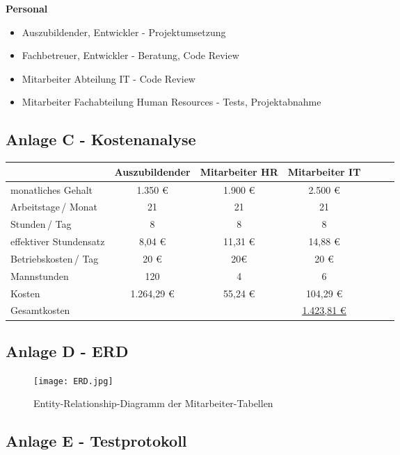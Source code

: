 {\textbf{Personal}}
    \begin{itemize}
        \item Auszubildender, Entwickler - Projektumsetzung
        \item Fachbetreuer, Entwickler - Beratung, Code Review
        \item Mitarbeiter Abteilung IT - Code Review
        \item Mitarbeiter Fachabteilung Human Resources - Tests, Projektabnahme
    \end{itemize}
\pagebreak

\subsection{Anlage C - Kostenanalyse}
\label{anlage:kosten}

\begin{table}[h]
    \centering
    \begin{tabular}{p{3cm} ccc p{3cm} p{3cm} p{3cm}}
        & Auszubildender & Mitarbeiter HR & Mitarbeiter IT\\
        \hline
        monatliches \mbox{Gehalt} & 1.350 € & 1.900 € & 2.500 € \\
        Arbeitstage\,/ \mbox{Monat} & 21 & 21 & 21\\
        Stunden\,/ Tag & 8 & 8 & 8\\
        effektiver \mbox{Stundensatz} & 8,04 € & 11,31 € & 14,88 €\\
        Betriebskosten\,/ Tag & 20 € & 20€ & 20 €\\
        Mannstunden & 120 & 4 & 6\\
        Kosten & 1.264,29 € & 55,24 € & 104,29 €\\
        \hline
        Gesamtkosten & & & \underline{\underline{1.423,81 €}}
    \end{tabular}
\end{table}
\pagebreak

\subsection{Anlage D - ERD}
\label{anlage:erd}

\begin{figure}[h]
    \texttt{[image: ERD.jpg]}
    \caption{Entity-Relationship-Diagramm der Mitarbeiter-Tabellen}
\end{figure}
\pagebreak

\subsection{Anlage E - Testprotokoll}
\label{anlage:test}

